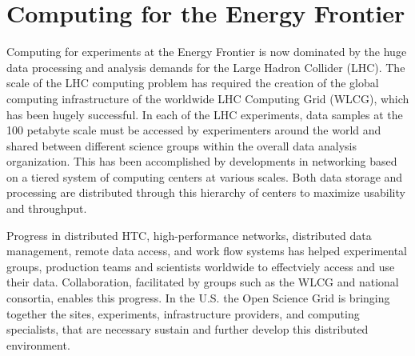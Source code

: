 \section{Computing for the Energy Frontier}

Computing for experiments at the Energy Frontier is now dominated by
the huge data processing and analysis demands for the Large Hadron Collider
(LHC). The scale of the LHC computing problem has required the creation of the
global computing infrastructure of the 
worldwide LHC Computing Grid (WLCG), which has been
hugely successful.  
In each of the LHC experiments, 
data samples at the 100 petabyte scale must be accessed by experimenters around 
the world and shared between different science groups within the overall 
data analysis organization.  This has been accomplished by developments 
in networking based on a tiered system of computing centers at various 
scales. Both data storage and processing are distributed through 
this hierarchy of centers to maximize usability and throughput.

Progress in distributed HTC, high-performance networks, distributed data 
management, remote data access, and work flow systems has helped 
experimental groups, production teams and scientists worldwide to
effectviely access 
and use their data. Collaboration, facilitated by groups such as 
the WLCG and national consortia, enables this progress.
In the U.S.  the Open Science Grid is  bringing together the sites, 
experiments, infrastructure
providers, and computing specialists, that are necessary sustain and
further develop this distributed environment.


